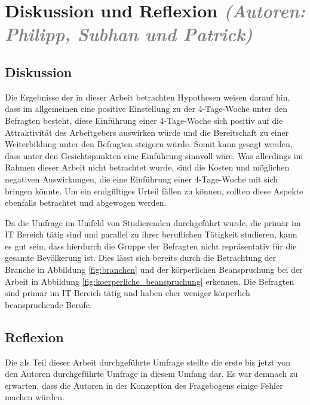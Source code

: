 \chapter{Diskussion und Reflexion \textit{\textcolor{gray}{(Autoren: Philipp, Subhan und Patrick)}}}


\section{Diskussion}
Die Ergebnisse der in dieser Arbeit betrachten Hypothesen weisen darauf hin, dass im allgemeinen eine 
positive Einstellung zu der 4-Tage-Woche unter den Befragten besteht, diese Einführung einer 4-Tage-Woche
sich positiv auf die Attraktivität des Arbeitgebers auswirken würde und die Bereitschaft zu einer Weiterbildung
unter den Befragten steigern würde.
Somit kann gesagt werden, dass unter den Gesichtspunkten eine Einführung sinnvoll wäre.
Was allerdings im Rahmen dieser Arbeit nicht betrachtet wurde, sind die Kosten und möglichen negativen Auswirkungen, 
die eine Einführung einer 4-Tage-Woche mit sich bringen könnte. Um ein endgültiges Urteil fällen zu können,
sollten diese Aspekte ebenfalls betrachtet und abgewogen werden.

Da die Umfrage im Umfeld von Studierenden durchgeführt wurde, die primär im IT Bereich tätig sind und parallel
zu ihrer beruflichen Tätigkeit studieren, kann es gut sein, dass hierdurch die Gruppe der Befragten nicht
repräsentativ für die gesamte Bevölkerung ist. 
Dies lässt sich bereits durch die Betrachtung der Branche in Abbildung \ref{fig:branchen} und der 
körperlichen Beanspruchung bei der Arbeit in Abbildung \ref{fig:koerperliche_beanspruchung} erkennen.
Die Befragten sind primär im IT Bereich tätig und haben eher weniger körperlich beanspruchende Berufe.


\section{Reflexion}
Die als Teil dieser Arbeit durchgeführte Umfrage stellte die erste bis jetzt von den Autoren durchgeführte
Umfrage in diesem Umfang dar. Es war demnach zu erwarten, dass die Autoren in der Konzeption des Fragebogens
einige Fehler machen würden. 

